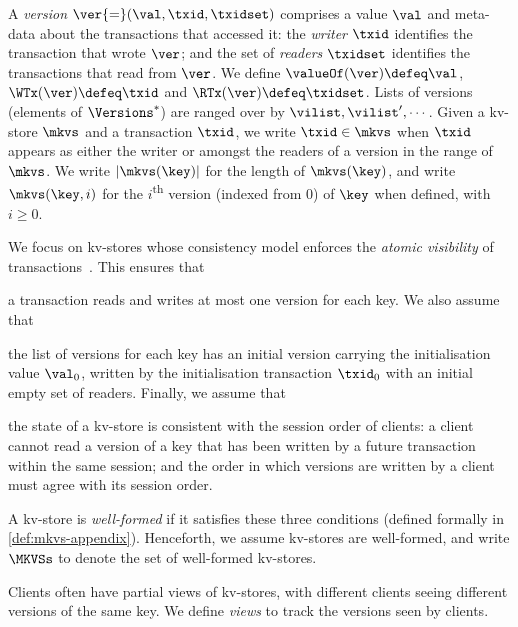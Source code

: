 A \emph{version} $\ver {=} (\val, \txid, \txidset)$ comprises  a value $\val$
and meta-data about the transactions that accessed it: the \emph{writer} $\txid$ identifies the transaction that wrote $\ver$;
and the set of \emph{readers} $\txidset$ identifies  the  transactions
that read from  $\ver$.
We define $\valueOf(\ver) \defeq \val$,
$\WTx(\ver) \defeq \txid$ and $\RTx(\ver) \defeq \txidset$. 
Lists of versions (elements of $\Versions^{\ast}$) are ranged over by $\vilist, \vilist',\cdots$.
Given a kv-store $\mkvs$ and a transaction $\txid$, we write 
$\txid \in \mkvs$ when $\txid$ appears as either the writer or amongst the readers of a version in the range of $\mkvs$.
We write  $\lvert \mkvs(\key) \rvert$ for the length of $\mkvs(\key)$, 
and write $\mkvs(\key, i)$ for the $i$\textsuperscript{th} version (indexed from 0) of $\key$ when defined, with $i \geq 0$.


We focus on kv-stores whose consistency model enforces the \emph{atomic visibility} of transactions~\cite{framework-concur}. 
This ensures that 
\begin{enumerate*}
	\item a transaction reads and writes at most one version for each key.
We also assume that 
	\item the list of versions for each key has an initial version 
carrying the initialisation value $\val_0$,  written by the 
initialisation transaction $\txid_0$ 
with an initial empty set of readers.
Finally, we assume that 
	\item the state of a kv-store is consistent with 
the session order of clients: a client cannot read a version of a key that has 
been written by a future transaction within the same session;  and 
the order in which versions are written by a client must agree 
with its session order. 
\end{enumerate*}
A kv-store is \emph{well-formed} if it satisfies these three conditions (defined formally in \cref{def:mkvs-appendix}). 
Henceforth, we assume kv-stores are well-formed, and write  $\MKVSs$ to denote 
the set of well-formed kv-stores.

Clients often have partial views of kv-stores, 
with different clients seeing 
different versions of the same key.
We define \emph{views} to track the versions seen by clients. 


